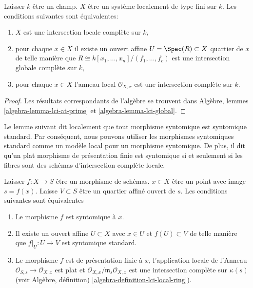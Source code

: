 \begin{lemma}

\label{lemma-local-complete-intersection}

Laisser $k$ être un champ. $X$ être un système localement de type fini sur $k$. Les conditions suivantes sont équivalentes:

\begin{enumerate}

\item  $X$ est une intersection locale complète sur $k$,
\item pour chaque $x \in X$ il existe un ouvert affine
$U = \Spec(R) \subset X$ quartier de $x$
de telle manière que $R \cong k[x_1, \ldots, x_n]/(f_1, \ldots, f_c)$
est une intersection globale complète sur $k$,
\item pour chaque $x \in X$ l'anneau local $\mathcal{O}_{X, x}$
est une intersection complète sur $k$.

\end{enumerate}

\end{lemma}

\begin{proof}
Les résultats correspondants de l'algèbre se trouvent dans Algèbre, lemmes \ref{algebra-lemma-lci-at-prime} et \ref{algebra-lemma-lci-global}.
\end{proof}

\noindent
Le lemme suivant dit localement que tout morphisme syntomique est syntomique standard. Par conséquent, nous pouvons utiliser les morphismes syntomiques standard comme un modèle local {\it} pour un morphisme syntomique. De plus, il dit qu'un plat morphisme de présentation finie est syntomique si et seulement si les fibres sont des schémas d'intersection complète locale.

\begin{lemma}

\label{lemma-syntomic-locally-standard-syntomic}

Laisser $f : X  \to S$ être un morphisme de schémas. $x \in X$ être un point avec image $s = f(x)$. Laisse $V \subset S$ être un quartier affiné ouvert de $s$. Les conditions suivantes sont équivalentes

\begin{enumerate}

\item Le morphisme $f$ est syntomique à $x$.
\item Il existe un ouvert affine $U \subset X$ avec $x \in U$ et
$f(U) \subset V$ de telle manière que $f|_U : U \to V$ est syntomique standard.
\item Le morphisme $f$ est de présentation finie à $x$, l'application locale de l'Anneau
$\mathcal{O}_{S, s} \to \mathcal{O}_{X, x}$
est plat et $\mathcal{O}_{X, x}/\mathfrak m_s \mathcal{O}_{X, x}$
est une intersection complète sur $\kappa(s)$ (voir Algèbre, définition) \ref{algebra-definition-lci-local-ring}).

\end{enumerate}

\end{lemma}

